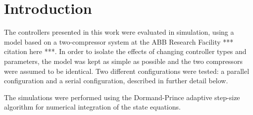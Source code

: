 \section{Introduction}

The controllers presented in this work were evaluated in simulation, using a model based on a two-compressor system at the ABB Research Facility *** citation here ***. 
In order to isolate the effects of changing controller types and parameters, the model was kept as simple as possible and the two compressors were assumed to be identical.
Two different configurations were tested: a parallel configuration and a serial configuration, described in further detail below.

The simulations were performed using the Dormand-Prince adaptive step-size algorithm for numerical integration of the state equations.



  

